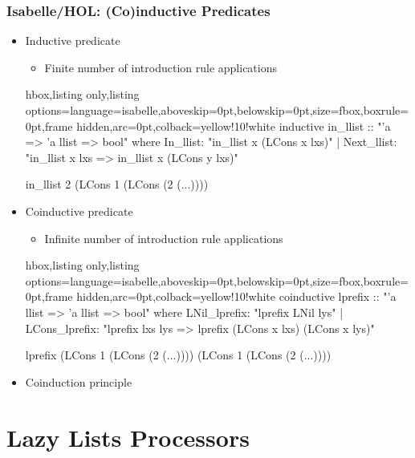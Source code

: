 \documentclass[aspectratio=169,10pt]{beamer}
\begin{document}
\begin{frame}[fragile]
  \frametitle{Isabelle/HOL: (Co)inductive Predicates}
  \begin{itemize}
    \item Inductive predicate
          \begin{itemize}
            \item Finite number of introduction rule applications
          \end{itemize}
          \vspace*{-1ex}
          \begin{tcblisting}{hbox,listing only,listing options={language=isabelle,aboveskip=0pt,belowskip=0pt},size=fbox,boxrule=0pt,frame hidden,arc=0pt,colback=yellow!10!white}
inductive in_llist :: "'a => 'a llist => bool" where
  In_llist: "in_llist x (LCons x lxs)"
| Next_llist: "in_llist x lxs => in_llist x (LCons y lxs)"

in_llist 2 (LCons 1 (LCons (2 (...))))
          \end{tcblisting}
          \vspace*{-1ex}
          \pause
    \item Coinductive predicate
          \begin{itemize}
            \item Infinite number of introduction rule applications
          \end{itemize}
          \vspace*{-1ex}
          \begin{tcblisting}{hbox,listing only,listing options={language=isabelle,aboveskip=0pt,belowskip=0pt},size=fbox,boxrule=0pt,frame hidden,arc=0pt,colback=yellow!10!white}
coinductive lprefix :: "'a llist => 'a llist => bool" where
  LNil_lprefix: "lprefix LNil lys"
| LCons_lprefix: "lprefix lxs lys => lprefix (LCons x lxs) (LCons x lys)"

lprefix (LCons 1 (LCons (2 (...)))) (LCons 1 (LCons (2 (...))))
          \end{tcblisting}
          \vspace*{-1ex}
          \pause
    \item Coinduction principle
  \end{itemize}
\end{frame}

\section{Lazy Lists Processors}
\end{document}
